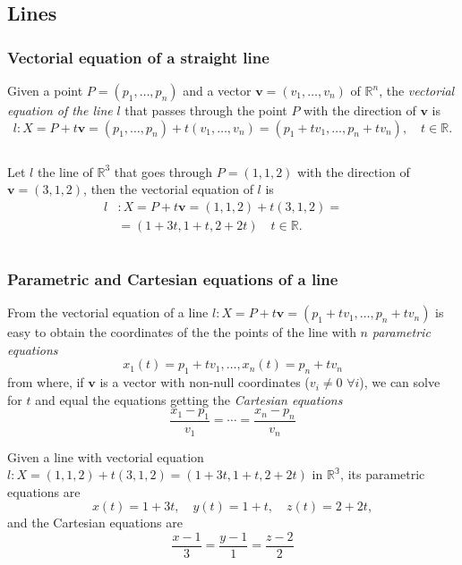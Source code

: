 \subsection{Lines}
\begin{frame}
\frametitle{Vectorial equation of a straight line}
\begin{definition}
Given a point $P=(p_1,\ldots,p_n)$ and a vector $\mathbf{v}=(v_1,\ldots,v_n)$ of $\mathbb{R}^n$, the \emph{vectorial equation of the line} $l$ that passes through the point $P$ with the direction of $\mathbf{v}$ is
\[
l: X= P + t\mathbf{v} = (p_1,\ldots,p_n)+t(v_1,\ldots,v_n) = (p_1+tv_1,\ldots,p_n+tv_n),\quad t\in\mathbb{R}.
\]
\end{definition}

\begin{columns}
\begin{column}{.48\textwidth}

Let $l$ the line of $\mathbb{R}^3$ that goes through $P=(1,1,2)$ with the direction of $\mathbf{v}=(3,1,2)$, then the vectorial equation of $l$ is
\begin{align*}
l &: X= P + t\mathbf{v} = (1,1,2)+t(3,1,2) =\\
&= (1+3t,1+t,2+2t)\quad t\in\mathbb{R}.
\end{align*}
\end{column}
\begin{column}{.48\textwidth}
\begin{center}

\end{center}
\end{column}
\end{columns}
\end{frame}


\begin{frame}
\frametitle{Parametric and Cartesian equations of a line}
From the vectorial equation of a line $l: X=P + t\mathbf{v}=(p_1+tv_1,\ldots,p_n+tv_n)$ is easy to obtain the coordinates of the the points of the line with $n$ \emph{parametric equations}
\[
x_1(t)=p_1+tv_1, \ldots, x_n(t)=p_n+tv_n
\]
from where, if $\mathbf{v}$ is a vector with non-null coordinates ($v_i\neq 0$ $\forall i$), we can solve for $t$ and equal the equations getting the \emph{Cartesian equations}  
\[
\frac{x_1-p_1}{v_1}=\cdots = \frac{x_n-p_n}{v_n}
\]

Given a line with vectorial equation $l: X=(1,1,2)+t(3,1,2) =(1+3t,1+t,2+2t)$ in $\mathbb{R^3}$, its parametric equations are 
\[
x(t) = 1+3t, \quad y(t)=1+t, \quad z(t)=2+2t,
\]
and the Cartesian equations are
\[
\frac{x-1}{3}=\frac{y-1}{1}=\frac{z-2}{2}
\]
\end{frame}


